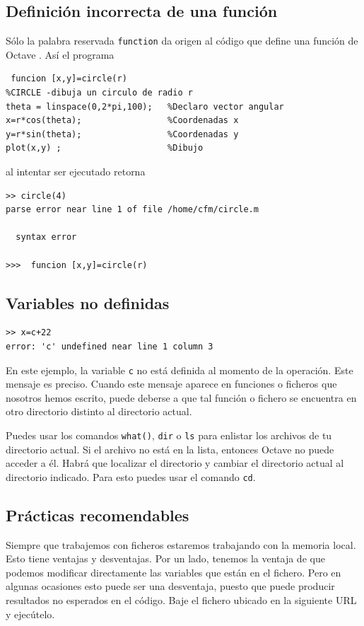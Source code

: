 \documentclass[letter,11pt]{article}
\newcommand\0{\mathbf{0}}
\newcommand{\octave}{{\sc Octave }}
\begin{document}
\subsection{Definici\'on incorrecta de una funci\'on}
S\'olo la palabra reservada \verb"function" da origen al c\'odigo que define una funci\'on de \octave. As\'i el programa
\begin{lstlisting}
 funcion [x,y]=circle(r) 
%CIRCLE -dibuja un circulo de radio r
theta = linspace(0,2*pi,100);   %Declaro vector angular
x=r*cos(theta);                 %Coordenadas x
y=r*sin(theta);                 %Coordenadas y
plot(x,y) ;                     %Dibujo
\end{lstlisting}
al intentar ser ejecutado retorna
\begin{lstlisting}
>> circle(4)
parse error near line 1 of file /home/cfm/circle.m

  syntax error

>>>  funcion [x,y]=circle(r)
\end{lstlisting}

\subsection{Variables no definidas}
\begin{lstlisting}
>> x=c+22
error: 'c' undefined near line 1 column 3
\end{lstlisting}
En este ejemplo, la variable \texttt{c} no est\'a definida al momento de la operaci\'on. Este 
mensaje es preciso. Cuando este mensaje aparece en funciones o ficheros que nosotros hemos escrito, puede 
deberse a que tal funci\'on o fichero se encuentra en otro directorio distinto 
al directorio actual. 

Puedes usar los comandos \texttt{what()}, \texttt{dir} o \texttt{ls} para enlistar los archivos de tu directorio actual. Si el archivo no est\'a en la lista, entonces \octave no puede acceder a \'el. Habr\'a que localizar el directorio y cambiar el directorio actual al directorio indicado. Para esto puedes usar el comando \texttt{cd}.

  \subsection{Pr\'acticas recomendables}
  Siempre que trabajemos con ficheros estaremos trabajando con la memoria local. Esto tiene ventajas 
  y desventajas. Por un lado, tenemos la ventaja de que podemos modificar directamente las variables 
  que est\'an en el fichero. Pero en algunas ocasiones esto puede ser una desventaja, puesto que puede producir resultados no esperados en el c\'odigo. Baje el fichero ubicado en la siguiente 
  URL y ejec\'utelo.
\end{document}
